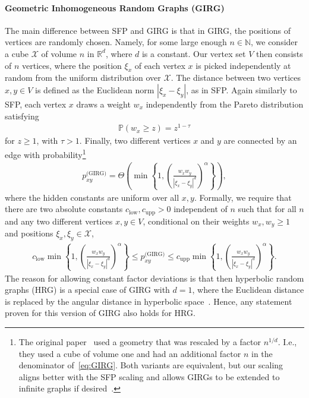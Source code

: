\documentclass[11pt, letterpaper, margin=1in]{amsart}
\theoremstyle{definition}
\theoremstyle{remark}
\renewcommand{\Pr}[1]{\ensuremath{\mathbb{P} \left(#1 \right) }}
\newcommand{\W}[1]{\ensuremath{ w_{ #1 } }}
\newcommand{\pGIRG}{\ensuremath{ p_{xy}^{\text{(GIRG)}} }}
\newcommand{\clow}{c_{\text{low}}}
\newcommand{\cupp}{c_{\text{upp}}}
\numberwithin{equation}{section}
\begin{document}
\medskip

\paragraph{\textbf{Geometric Inhomogeneous Random Graphs (GIRG)}}

The main difference between SFP and GIRG is that in GIRG, the positions of vertices are randomly chosen. Namely, for some large enough $n \in \mathbb{N}$, we consider a cube $\mathcal{X}$ of volume $n$ in $\mathbb{R}^d$, where $d$ is a constant. Our vertex set $V$ then consists of $n$ vertices, where the position $\xi_x$ of each vertex $x$ is picked independently at random from the uniform distribution over $\mathcal{X}$. The distance between two vertices $x,y \in V$ is defined as the Euclidean norm  $|\xi_x - \xi_y|$, as in SFP. Again similarly to SFP, each vertex $x$ draws a weight $w_x$ independently from the Pareto distribution satisfying 
\begin{align*}
    \Pr{\W{x} \ge z} = z^{1-\tau}
\end{align*} for $z \ge 1$, with $\tau > 1$. Finally, two different vertices $x$ and $y$ are connected by an edge with probability\footnote{The original paper~\cite{bringmann2019geometric} used a geometry that was rescaled by a factor $n^{1/d}$. I.e., they used a cube of volume one and had an additional factor $n$ in the denominator of~\eqref{eq:GIRG}. Both variants are equivalent, but our scaling aligns better with the SFP scaling and allows GIRGs to be extended to infinite graphs if desired~\cite{komjathy2020explosion}.}
\begin{align}\label{eq:GIRG}
\pGIRG = \Theta\left(\min\left\{ 1 , \left( \frac{w_xw_y}{|\xi_x - \xi_y|^{ d}} \right)^\alpha \right\}\right),
\end{align}
where the hidden constants are uniform over all $x,y$. Formally, we require that there are two absolute constants $\clow,\cupp >0$ independent of $n$ such that for all $n$ and any two different vertices $x,y\in V$, conditional on their weights $w_x,w_y \ge 1$ and positions $\xi_x,\xi_y\in \mathcal X$, 
\begin{align*}
\clow \min\left\{ 1 , \left( \frac{w_xw_y}{|\xi_x - \xi_y|^{ d}} \right)^\alpha \right\} \le \pGIRG \le \cupp\min\left\{ 1 , \left( \frac{w_xw_y}{|\xi_x - \xi_y|^{ d}} \right)^\alpha \right\}.
\end{align*}
The reason for allowing constant factor deviations is that then hyperbolic random graphs (HRG) is a special case of GIRG with $d=1$, where the Euclidean distance is replaced by the angular distance in hyperbolic space~\cite{bringmann2019geometric}. Hence, any statement proven for this version of GIRG also holds for HRG.
\end{document}

